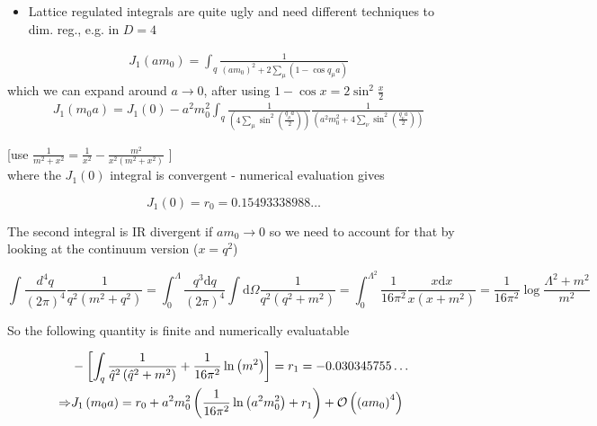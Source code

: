 \begin{itemize}
  \item Lattice regulated integrals are quite ugly and need different techniques to dim. reg., e.g. in \(D=4\)
\end{itemize}
%
\begin{equation}
\begin{aligned}
& J_{1}\left(a m_{0}\right)=\int_{q} \frac{1}{\left(a m_{0}\right)^{2}+2 \sum_{\mu}\left(1-\cos q_{\mu}a\right)}
\end{aligned}
\end{equation}
%
which we can expand around \(a \rightarrow 0\), after using $1 - \cos x = 2 \sin^2 \frac{x}{2}$
%
\begin{equation}
\begin{aligned}
& J_{1}(m_0 a)=J_{1}(0)-a^{2} m_{0}^{2} \int_{q} \frac{1}{\left(4 \sum_{\mu} \sin ^{2}\left(\frac{q_\mu a}{2} \right)\right)} \frac{1}{\left(a^{2} m_{0}^{2}+4 \sum_{\nu} \sin ^{2}\left(\frac{q_\nu a}{2}\right)\right)}
\end{aligned}
\end{equation}

[use \(\frac{1}{m^{2}+x^{2}}=\frac{1}{x^{2}}-\frac{m^{2}}{x^{2}\left(m^{2}+x^{2}\right)}\) ]\\
where the \(J_{1}(0)\) integral is convergent - numerical evaluation gives

\begin{equation}
J_{1}(0)=r_{0}=0.15493338988 \ldots
\end{equation}

The second integral is IR divergent if $a m_0 \rightarrow 0$ so we need to account for that by looking at the continuum version ($x=q^2$)

\begin{equation}
    \int \frac{d^4q}{(2 \pi)^4}\frac{1}{q^2(m^2 + q^2)} = \int_0^\Lambda \frac{q^3 \text{d} q}{(2 \pi)^4} \int \text{d}\Omega \frac{1}{q^2(q^2+m^2)} = \int_0^{\Lambda^2} \frac{1}{16 \pi^2} \frac{x \text{d}x}{x(x+m^2)} = \frac{1}{16 \pi^2}\log \frac{\Lambda^2 + m^2}{m^2}
\end{equation}

So the following quantity is finite and numerically evaluatable

\begin{equation}
\begin{aligned}
& - {\left[\int_{q} \frac{1}{\hat{q}^{2}\left(\hat{q}^{2}+m^{2}\right)}+\frac{1}{16 \pi^{2}} \ln \left(m^{2}\right)\right]=r_{1}=-0.030345755 \ldots } \\
\Rightarrow & J_{1}\left(m_{0} a\right)=r_{0}+a^{2} m_{0}^{2}\left(\frac{1}{16 \pi^{2}} \ln \left(a^{2} m_{0}^{2}\right)+r_{1}\right)+{\cal O}\left(\left(a m_{0}\right)^{4}\right)
\end{aligned}
\end{equation}


